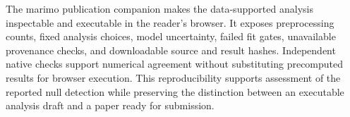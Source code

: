 The marimo publication companion makes the data-supported analysis inspectable and executable in the reader's browser. It exposes preprocessing counts, fixed analysis choices, model uncertainty, failed fit gates, unavailable provenance checks, and downloadable source and result hashes. Independent native checks support numerical agreement without substituting precomputed results for browser execution. This reproducibility supports assessment of the reported null detection while preserving the distinction between an executable analysis draft and a paper ready for submission.
